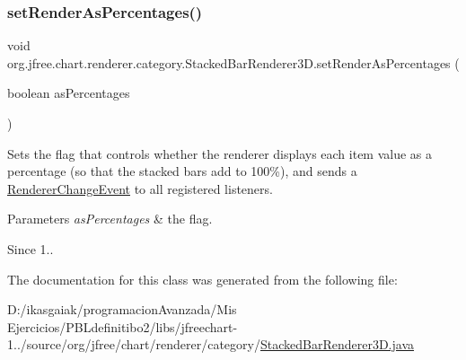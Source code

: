 \subsubsection{\texorpdfstring{set\+Render\+As\+Percentages()}{setRenderAsPercentages()}}
{\footnotesize\ttfamily void org.\+jfree.\+chart.\+renderer.\+category.\+Stacked\+Bar\+Renderer3\+D.\+set\+Render\+As\+Percentages (\begin{DoxyParamCaption}\item[{boolean}]{as\+Percentages }\end{DoxyParamCaption})}

Sets the flag that controls whether the renderer displays each item value as a percentage (so that the stacked bars add to 100\%), and sends a \mbox{\hyperlink{}{Renderer\+Change\+Event}} to all registered listeners.


\begin{DoxyParams}{Parameters}
{\em as\+Percentages} & the flag.\\
\hline
\end{DoxyParams}
\begin{DoxySince}{Since}
1.. 
\end{DoxySince}


The documentation for this class was generated from the following file\+:\begin{DoxyCompactItemize}
\item 
D\+:/ikasgaiak/programacion\+Avanzada/\+Mis Ejercicios/\+P\+B\+Ldefinitibo2/libs/jfreechart-\/1../source/org/jfree/chart/renderer/category/\mbox{\hyperlink{_stacked_bar_renderer3_d_8java}{Stacked\+Bar\+Renderer3\+D.\+java}}\end{DoxyCompactItemize}
